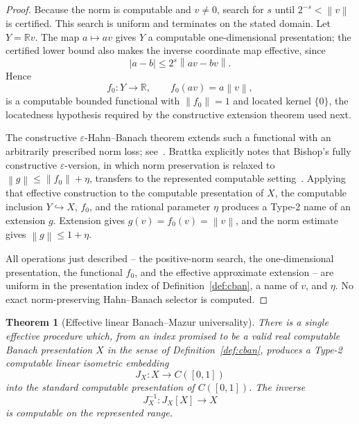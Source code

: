 \documentclass[11pt]{article}
\newtheorem{theorem}{Theorem}[section]
\theoremstyle{definition}
\newcommand{\norm}[1]{\left\lVert #1 \right\rVert}
\newcommand{\R}{\mathbb{R}}
\begin{document}
\begin{proof}
Because the norm is computable and $v\ne0$, search for $s$ until $2^{-s}<\norm v$ is
certified.  This search is uniform and terminates on the stated domain.  Let $Y=\R v$.
The map $a\mapsto av$ gives $Y$ a computable one-dimensional presentation; the certified
lower bound also makes the inverse coordinate map effective, since
\[
 |a-b|\le 2^s\norm{av-bv}.
\]
Hence
\[
 f_0:Y\to\R,\qquad f_0(av)=a\norm v,
\]
is a computable bounded functional with $\norm{f_0}=1$ and located kernel $\{0\}$, the locatedness hypothesis required by the constructive extension theorem used next.

The constructive $\varepsilon$-Hahn--Banach theorem extends such a functional with an
arbitrarily prescribed norm loss; see~\cite[Chap.~7, Thm.~4.6, p.~342]{BishopBridges}.
Brattka explicitly notes that Bishop's fully constructive $\varepsilon$-version, in which
norm preservation is relaxed to $\norm g\le\norm{f_0}+\eta$, transfers to the represented
computable setting~\cite{Brattka2005}.  Applying that effective construction to the
computable presentation of $X$, the computable inclusion $Y\hookrightarrow X$, $f_0$, and
the rational parameter $\eta$ produces a Type-2 name of an extension $g$.  Extension gives
$g(v)=f_0(v)=\norm v$, and the norm estimate gives $\norm g\le1+\eta$.

All operations just described -- the positive-norm search, the one-dimensional presentation,
the functional $f_0$, and the effective approximate extension -- are uniform in the
presentation index of Definition~\ref{def:cban}, a name of $v$, and $\eta$.  No exact norm-preserving Hahn--Banach
selector is computed.
\end{proof}

\begin{theorem}[Effective linear Banach--Mazur universality]\label{thm:U}
There is a single effective procedure which, from an index promised to be a valid real
computable Banach presentation $X$ in the sense of Definition~\ref{def:cban}, produces a Type-2 computable linear isometric embedding
\[
 J_X:X\longrightarrow C([0,1])
\]
into the standard computable presentation of $C([0,1])$.  The inverse
\[
 J_X^{-1}:J_X[X]\longrightarrow X
\]
is computable on the represented range.
\end{theorem}
\end{document}
